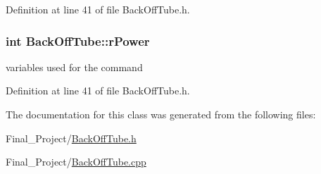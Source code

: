 Definition at line 41 of file Back\-Off\-Tube.\-h.

\hypertarget{classBackOffTube_aa03d7c0535e3d7dd4c45a0453ea9f3aa}{
\subsubsection[{r\-Power}]{\setlength{\rightskip}{0pt plus 5cm}int Back\-Off\-Tube\-::r\-Power\hspace{0.3cm}{\ttfamily [private]}}}\label{classBackOffTube_aa03d7c0535e3d7dd4c45a0453ea9f3aa}


variables used for the command 



Definition at line 41 of file Back\-Off\-Tube.\-h.



The documentation for this class was generated from the following files\-:\begin{DoxyCompactItemize}
\item 
Final\-\_\-\-Project/\hyperlink{BackOffTube_8h}{Back\-Off\-Tube.\-h}\item 
Final\-\_\-\-Project/\hyperlink{BackOffTube_8cpp}{Back\-Off\-Tube.\-cpp}\end{DoxyCompactItemize}

